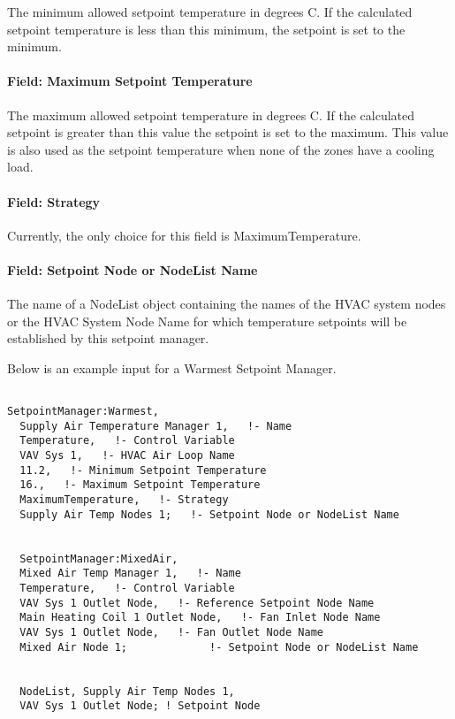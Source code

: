 The minimum allowed setpoint temperature in degrees C. If the calculated setpoint temperature is less than this minimum, the setpoint is set to the minimum.

\paragraph{Field: Maximum Setpoint Temperature}\label{field-maximum-setpoint-temperature-1}

The maximum allowed setpoint temperature in degrees C. If the calculated setpoint is greater than this value the setpoint is set to the maximum. This value is also used as the setpoint temperature when none of the zones have a cooling load.

\paragraph{Field: Strategy}\label{field-strategy}

Currently, the only choice for this field is MaximumTemperature.

\paragraph{Field: Setpoint Node or NodeList Name}\label{field-setpoint-node-or-nodelist-name-10}

The name of a NodeList object containing the names of the HVAC system nodes or the HVAC System Node Name for which temperature setpoints will be established by this setpoint manager.

Below is an example input for a Warmest Setpoint Manager.

\begin{lstlisting}

SetpointManager:Warmest,
  Supply Air Temperature Manager 1,   !- Name
  Temperature,   !- Control Variable
  VAV Sys 1,   !- HVAC Air Loop Name
  11.2,   !- Minimum Setpoint Temperature
  16.,   !- Maximum Setpoint Temperature
  MaximumTemperature,   !- Strategy
  Supply Air Temp Nodes 1;   !- Setpoint Node or NodeList Name


  SetpointManager:MixedAir,
  Mixed Air Temp Manager 1,   !- Name
  Temperature,   !- Control Variable
  VAV Sys 1 Outlet Node,   !- Reference Setpoint Node Name
  Main Heating Coil 1 Outlet Node,   !- Fan Inlet Node Name
  VAV Sys 1 Outlet Node,   !- Fan Outlet Node Name
  Mixed Air Node 1;             !- Setpoint Node or NodeList Name


  NodeList, Supply Air Temp Nodes 1,
  VAV Sys 1 Outlet Node; ! Setpoint Node
\end{lstlisting}

